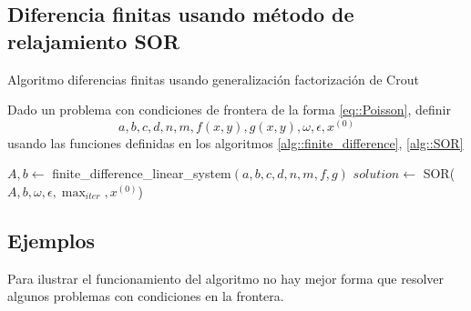 \documentclass[a4paper]{article}
\begin{document}
\subsection{Diferencia finitas usando método de relajamiento SOR}
\begin{algorithm}[H]
\caption{Algoritmo diferencias finitas usando generalización factorización de Crout}\label{alg::finite_diff_Crout}
Dado un problema con condiciones de frontera de la forma \ref{eq::Poisson}, definir
\begin{equation*}
a,b,c,d,n,m,f(x,y),g(x,y),\omega,\epsilon,x^{(0)}
\end{equation*}
usando las funciones definidas en los algoritmos \ref{alg::finite_difference}, \ref{alg::SOR}
\begin{algorithmic}
\State $A, b\gets$ finite\_difference\_linear\_system$(a,b,c,d,n,m,f,g)$
\State $solution\gets $ SOR($A,b,\omega,\epsilon,\max_{iter},x^{(0)}$)
\end{algorithmic}
\end{algorithm}
\subsection{Ejemplos}
Para ilustrar el funcionamiento del algoritmo no hay mejor forma que resolver algunos problemas con condiciones en la frontera.
\end{document}
